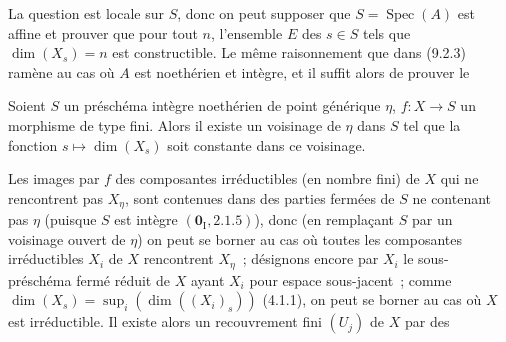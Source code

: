 La question est locale sur $S$, donc on peut supposer que
$S=\operatorname{Spec}(A)$ est affine et prouver que pour tout $n$, l'ensemble
$E$ des $s\in S$ tels que $\dim(X_s)=n$ est constructible. Le même
raisonnement que dans (9.2.3) ramène au cas où $A$ est noethérien et intègre,
et il suffit alors de prouver le

\begin{corollary}[9.2.6.2]
\label{IV.9.2.6.2-fr}
Soient $S$ un préschéma intègre noethérien de point générique $\eta$,
$f:X\to S$ un morphisme de type fini. Alors il existe un voisinage de $\eta$
dans $S$ tel que la fonction $s\mapsto\dim(X_s)$ soit constante dans ce
voisinage.
\end{corollary}

Les images par $f$ des composantes irréductibles (en nombre fini) de $X$ qui
ne rencontrent pas $X_\eta$, sont contenues dans des parties fermées de $S$ ne
contenant pas $\eta$ (puisque $S$ est intègre
$(\mathbf 0_{\mathrm I},2.1.5)$), donc (en remplaçant $S$ par un voisinage
ouvert de $\eta$) on peut se borner au cas où toutes les composantes
irréductibles $X_i$ de $X$ rencontrent $X_\eta$~; désignons encore par $X_i$
le sous-préschéma fermé réduit de $X$ ayant $X_i$ pour espace sous-jacent~;
comme $\dim(X_s)=\sup_i(\dim((X_i)_s))$ (4.1.1), on peut se borner au cas où
$X$ est irréductible. Il existe alors un recouvrement fini $(U_j)$ de $X$ par
des

